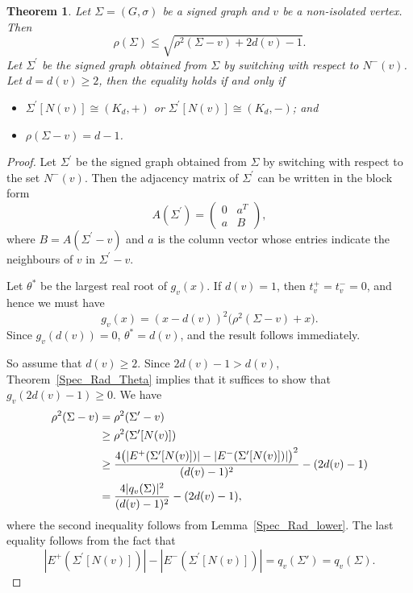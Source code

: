 \documentclass[12pt]{article}
\theoremstyle{plain}
\newtheorem{theorem}{Theorem}[section]
\numberwithin{equation}{section}
\begin{document}
	\begin{theorem}\label{Spec_Rad_Bound1}
		Let $\Sigma=(G,\sigma) $ be a signed graph and $v$ be a non-isolated vertex.  Then \[\rho(\Sigma) \leq \sqrt{\rho^2(\Sigma-v)+2d(v)-1}.\]
		Let $\Sigma^\prime$ be the signed graph obtained from  $\Sigma$ by switching with respect to $N^{-}(v)$. Let $d=d(v) \ge 2$, then the equality holds if and only if
		\begin{itemize}
			\item[(a)] $\Sigma^\prime[N(v)]\cong (K_d,+)$ or
			$\Sigma^\prime[N(v)]\cong (K_d,-)$; and
			\item[(b)] $\rho(\Sigma-v)=d-1$.
		\end{itemize}
	\end{theorem}
	\begin{proof}
		Let $\Sigma^\prime$ be the signed graph obtained from $\Sigma$ by switching with respect to the set $N^-(v)$. Then the adjacency matrix of $\Sigma^\prime$ can be written in the block form
		\[
		A(\Sigma^\prime)=
		\begin{pmatrix}
			0 & a^T\\
			a & B
		\end{pmatrix},
		\]
		where $B=A(\Sigma^\prime-v)$ and $a$ is the column vector whose entries indicate the neighbours of $v$ in $\Sigma^\prime-v$.
		
		Let $\theta^*$ be the largest real root of $g_v(x)$.
		If $d(v)=1$, then $t_v^+=t_v^-=0$, and hence we must have
		\[
		g_v(x)=(x-d(v))^2\bigl(\rho^{2}(\Sigma-v)+x\bigr).
		\]
		Since $g_v(d(v))=0$, $\theta^*=d(v)$, and the result follows immediately.
		
		So assume that $d(v)\ge 2$. Since $2d(v)-1>d(v)$, Theorem~\ref{Spec_Rad_Theta} implies that it suffices to show that $g_v(2d(v)-1)\ge 0.$
		We have
		\begin{align}
			\rho^2(\Sigma-v)
			&=\rho^2(\Sigma^\prime-v) \notag\\
			&\ge \rho^2(\Sigma^\prime[N(v)]) \label{Nbr_Ineq_1} \\
			&\ge
			\frac{4\bigl(|E^{+}(\Sigma^\prime[N(v)])|-|E^{-}(\Sigma^\prime[N(v)])|\bigr)^2}
			{(d(v)-1)^2}
			-(2d(v)-1) \label{Nbr_Ineq_2}\\
			&=
			\frac{4\vert q_v(\Sigma)\vert^2}{(d(v)-1)^2}
			-(2d(v)-1)\notag,
		\end{align}
		where the second inequality follows from Lemma~\ref{Spec_Rad_lower}. The last equality follows from the fact that 
		\[
		|E^{+}(\Sigma^\prime[N(v)])|-|E^{-}(\Sigma^\prime[N(v)])|
		= q_v(\Sigma')=q_v(\Sigma).
		\]
		

\end{proof}
\end{document}
